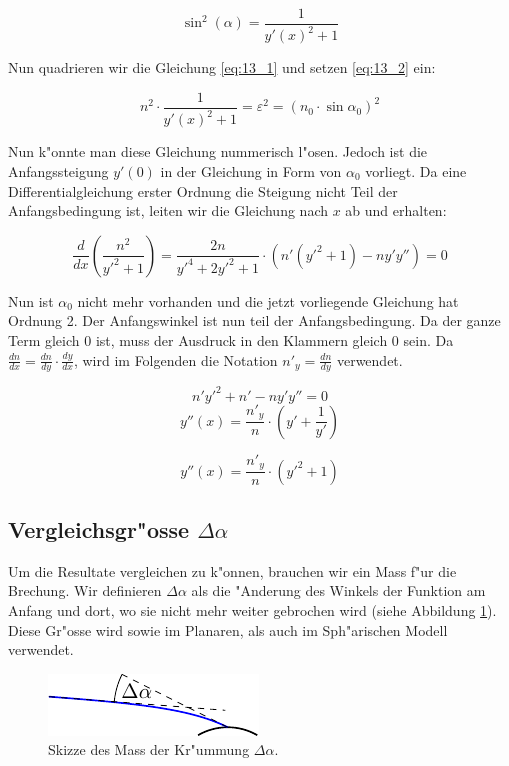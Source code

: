 \begin{refsection}
\begin{equation} \label{eq:13_2}
\sin^2 (\alpha) = \frac{1}{y'(x)^2 + 1}
\end{equation}

Nun quadrieren wir die Gleichung \ref{eq:13_1} und setzen \ref{eq:13_2} ein:

$$n^2 \cdot \frac{1}{y'(x)^2 + 1} = \varepsilon^2 = (n_0 \cdot \sin \alpha_0)^2$$

Nun k"onnte man diese Gleichung nummerisch l"osen. 
Jedoch ist die Anfangssteigung $y'(0)$ in der Gleichung in Form von $\alpha_0$ vorliegt. 
Da eine Differentialgleichung erster Ordnung die Steigung nicht Teil der Anfangsbedingung ist, leiten wir die Gleichung nach $x$ ab und erhalten:

$$\frac{d}{dx} \left( \frac{n^2}{y'^2 + 1} \right) = \frac{2n}{y'^4 + 2y'^2 + 1} \cdot \left( n'(y'^2 + 1) - n y' y'' \right) = 0$$

Nun ist $\alpha_0$ nicht mehr vorhanden und die jetzt vorliegende Gleichung hat Ordnung 2. 
Der Anfangswinkel ist nun teil der Anfangsbedingung. 
Da der ganze Term gleich 0 ist, muss der Ausdruck in den Klammern gleich 0 sein.
Da $\frac{dn}{dx} = \frac{dn}{dy} \cdot \frac{dy}{dx}$, wird im Folgenden die Notation $n'_y = \frac{dn}{dy}$ verwendet.

$$n' y'^2 + n' - n y' y'' = 0$$
$$y''(x) = \frac{n'_y}{n} \cdot \left( y' + \frac{1}{y'} \right)$$

\begin{equation} \label{eq:planar_DGL}
y''(x) = \frac{n'_y}{n} \cdot \left( y'^2 + 1\right)
\end{equation}

\subsection{Vergleichsgr"osse $\Delta \alpha$}
Um die Resultate vergleichen zu k"onnen, brauchen wir ein Mass f"ur die Brechung. 
Wir definieren $\Delta \alpha$ als die "Anderung des Winkels der Funktion am Anfang und dort, wo sie nicht mehr weiter gebrochen wird (siehe Abbildung \ref{fig:skizze_mass}). Diese Gr"osse wird sowie im Planaren, als auch im Sph"arischen Modell verwendet. 

\begin{figure}
  \centering
  \includegraphics{licht/standalone/fig_delta_alpha.pdf}
  \caption{Skizze des Mass der Kr"ummung $\Delta \alpha$. \label{fig:skizze_mass}}
\end{figure}



\end{refsection}
